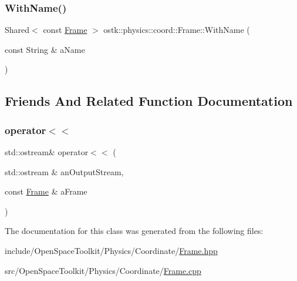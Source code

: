 \mbox{\label{classostk_1_1physics_1_1coord_1_1_frame_ad9f12f000a68daaec4969ba739f43ee7}} 
\subsubsection{\texorpdfstring{With\+Name()}{WithName()}}
{\footnotesize\ttfamily Shared$<$ const \hyperlink{classostk_1_1physics_1_1coord_1_1_frame}{Frame} $>$ ostk\+::physics\+::coord\+::\+Frame\+::\+With\+Name (\begin{DoxyParamCaption}\item[{const String \&}]{a\+Name }\end{DoxyParamCaption})\hspace{0.3cm}{\ttfamily [static]}}



\subsection{Friends And Related Function Documentation}
\mbox{\label{classostk_1_1physics_1_1coord_1_1_frame_a509ac1926cfc3553748bace204e2b1cc}} 
\subsubsection{\texorpdfstring{operator$<$$<$}{operator<<}}
{\footnotesize\ttfamily std\+::ostream\& operator$<$$<$ (\begin{DoxyParamCaption}\item[{std\+::ostream \&}]{an\+Output\+Stream,  }\item[{const \hyperlink{classostk_1_1physics_1_1coord_1_1_frame}{Frame} \&}]{a\+Frame }\end{DoxyParamCaption})\hspace{0.3cm}{\ttfamily [friend]}}



The documentation for this class was generated from the following files\+:\begin{DoxyCompactItemize}
\item 
include/\+Open\+Space\+Toolkit/\+Physics/\+Coordinate/\hyperlink{_frame_8hpp}{Frame.\+hpp}\item 
src/\+Open\+Space\+Toolkit/\+Physics/\+Coordinate/\hyperlink{_frame_8cpp}{Frame.\+cpp}\end{DoxyCompactItemize}
